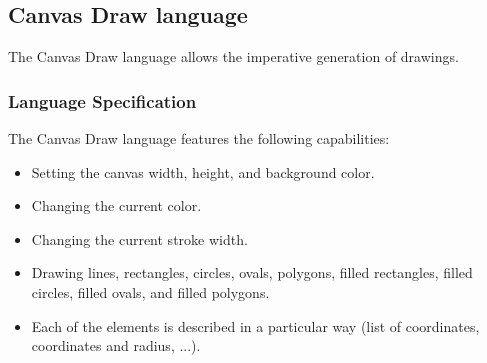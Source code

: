 \documentclass[a4paper,twoside,onecolumn]{article}
\begin{document}
\subsection{Canvas Draw language} \label{sec:langcanv}

The Canvas Draw language allows the imperative generation of drawings.

\subsubsection{Language Specification}

The Canvas Draw language features the following capabilities:

\begin{itemize}
\item Setting the canvas width, height, and background color.
\item Changing the current color.
\item Changing the current stroke width.
\item Drawing lines, rectangles, circles, ovals, polygons, filled rectangles, filled circles, filled ovals, and filled polygons.
\item Each of the elements is described in a particular way (list of coordinates, coordinates and radius, ...).
\end{itemize}
\end{document}

